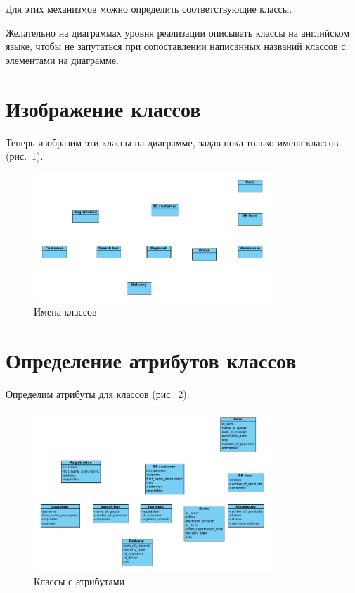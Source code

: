 Для этих механизмов можно определить соответствующие классы.\par
Желательно на диаграммах уровня реализации описывать классы на
английском языке, чтобы не запутаться при сопоставлении написанных
названий классов с элементами на диаграмме.

\section{Изображение классов}
Теперь изобразим эти классы на диаграмме, задав пока только
имена классов (рис.~\ref{fig:classes}).

\begin{figure}[h!tp]
	\centering
	\includegraphics[width=0.8\textwidth]{Screenshot from 2023-04-03 13-30-37}
	\caption{Имена классов}
	\label{fig:classes}
\end{figure}

\section{Определение атрибутов классов}
Определим атрибуты для классов (рис.~\ref{fig:classes:atr}).

\begin{figure}[h!tp]
	\centering
	\includegraphics[width=0.8\textwidth]{Screenshot from 2023-04-03 13-38-40}
	\caption{Классы с атрибутами}
	\label{fig:classes:atr}
\end{figure}

